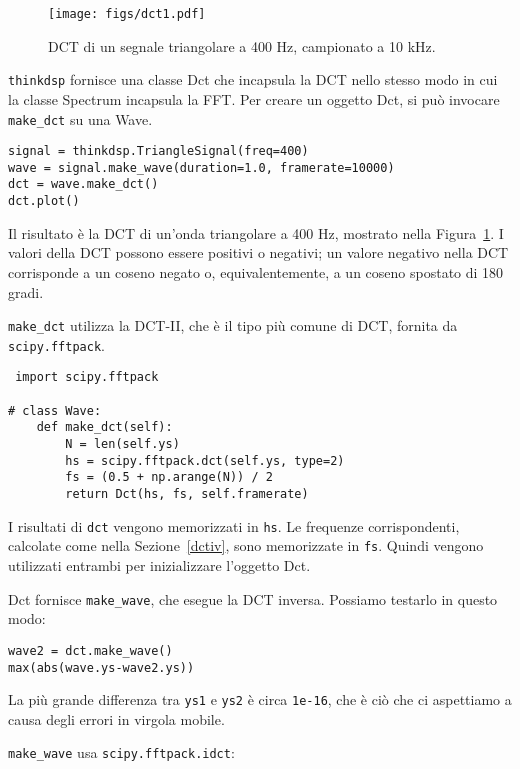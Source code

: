 \documentclass[12pt]{book} \usepackage[width=5.5in,height=8.5in, hmarginratio=3:2,vmarginratio=1:1]{geometry}
\begin{document}
\begin{figure} 

\centerline{\texttt{[image: figs/dct1.pdf]}} \caption{DCT di un segnale triangolare a 400 Hz, campionato a 10 kHz.} \label{fig.dct1} \end{figure} 

{\tt thinkdsp} fornisce una classe Dct che incapsula la DCT nello stesso modo in cui la classe Spectrum incapsula la FFT. Per creare un oggetto Dct, si può invocare \verb"make_dct" su una Wave.

\begin{verbatim} 
signal = thinkdsp.TriangleSignal(freq=400)
wave = signal.make_wave(duration=1.0, framerate=10000)
dct = wave.make_dct()
dct.plot()
 \end{verbatim} 

Il risultato è la DCT di un'onda triangolare a 400 Hz, mostrato nella Figura~\ref{fig.dct1}. I valori della DCT possono essere positivi o negativi; un valore negativo nella DCT corrisponde a un coseno negato o, equivalentemente, a un coseno spostato di 180 gradi.

\verb"make_dct" utilizza la DCT-II, che è il tipo più comune di DCT, fornita da {\tt scipy.fftpack}.

\begin{verbatim} import scipy.fftpack

# class Wave:
    def make_dct(self):
        N = len(self.ys)
        hs = scipy.fftpack.dct(self.ys, type=2)
        fs = (0.5 + np.arange(N)) / 2
        return Dct(hs, fs, self.framerate)
 \end{verbatim} 

I risultati di {\tt dct} vengono memorizzati in {\tt hs}. Le frequenze corrispondenti, calcolate come nella Sezione~\ref{dctiv}, sono memorizzate in {\tt fs}. Quindi vengono utilizzati entrambi per inizializzare l'oggetto Dct.

Dct fornisce \verb"make_wave", che esegue la DCT inversa. Possiamo testarlo in questo modo:

\begin{verbatim} 
wave2 = dct.make_wave()
max(abs(wave.ys-wave2.ys))
 \end{verbatim} 

La più grande differenza tra {\tt ys1} e {\tt ys2} è circa {\tt 1e-16}, che è ciò che ci aspettiamo a causa degli errori in virgola mobile.

\verb"make_wave" usa {\tt scipy.fftpack.idct}:
\end{document}
